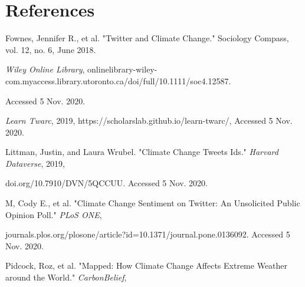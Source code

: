 \documentclass[fontsize=11pt]{article}
\begin{document}

\section*{References}

\begin{flushleft}


Fownes, Jennifer R., et al. "Twitter and Climate Change." Sociology Compass, vol. 12, no. 6, June 2018. 

\smallskip

\qquad \textit{Wiley Online Library}, onlinelibrary-wiley-com.myaccess.library.utoronto.ca/doi/full/10.1111/soc4.12587. 

\smallskip

\qquad Accessed 5 Nov. 2020.

\vspace{0.3 cm}


\textit{Learn Twarc}, 2019, https://scholarslab.github.io/learn-twarc/, Accessed 5 Nov. 2020.

\vspace{0.3 cm}


Littman, Justin, and Laura Wrubel. "Climate Change Tweets Ids." \textit{Harvard Dataverse}, 2019, 

\smallskip

\qquad doi.org/10.7910/DVN/5QCCUU. Accessed 5 Nov. 2020.

\vspace{0.3 cm}


M, Cody E., et al. "Climate Change Sentiment on Twitter: An Unsolicited Public Opinion Poll." \textit{PLoS ONE},

\smallskip

\qquad journals.plos.org/plosone/article?id=10.1371/journal.pone.0136092. Accessed 5 Nov. 2020.

\vspace{0.3 cm}

Pidcock, Roz, et al. "Mapped: How Climate Change Affects Extreme Weather around the World." \textit{CarbonBelief}, 


\end{flushleft}
\end{document}
